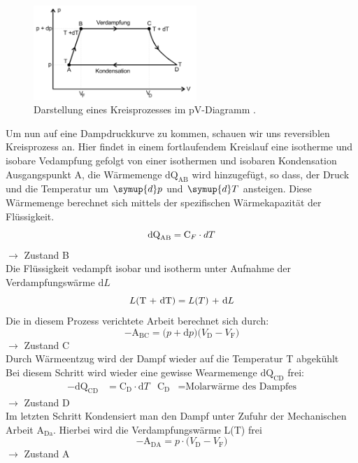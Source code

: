 \begin{figure}[H]
    \centering
    \includegraphics[width=0.55\textwidth]{images/Kreislauf.PNG}
    \caption{Darstellung eines Kreisprozesses im pV-Diagramm \protect \cite{V203}.}
    \label{img:Kreislauf}
\end{figure}
Um nun auf eine Dampdruckkurve zu kommen, schauen wir uns reversiblen Kreisprozess an. Hier findet in einem fortlaufendem 
Kreislauf eine isotherme und isobare Vedampfung gefolgt von einer isothermen und isobaren Kondensation
Ausgangspunkt A, die Wärmemenge $\text{dQ}_\text{AB} $ wird hinzugefügt, so dass, der Druck und die Temperatur um $\symup{d}p$ und $\symup{d}T$ ansteigen.
Diese Wärmemenge berechnet sich mittels der spezifischen Wärmekapazität der Flüssigkeit.
\begin{equation}
    \text{dQ}_\text{AB}= \text{C}_F \cdot dT \nonumber\\
\end{equation}
$\rightarrow$ Zustand B\\
Die Flüssigkeit vedampft isobar und isotherm unter Aufnahme der Verdampfungswärme d$L$\\
\begin{equation}
L\text{(T + dT)} = L\text{(}T\text{) + d}L\nonumber\\
\end{equation}
Die in diesem Prozess verichtete Arbeit berechnet sich durch:\\
\begin{equation}
   - \text{A}_\text{BC} = \text{(}p + \text{d}p\text{)(}V_\text{D} - V_\text{F}\text{)} \nonumber
\end{equation}
$\rightarrow$ Zustand C\\
Durch Wärmeentzug wird der Dampf wieder auf die Temperatur T abgekühlt \\
Bei diesem Schritt wird wieder eine gewisse Wearmemenge $\text{dQ}_\text{CD}$ frei:
\begin{align}
 -\text{dQ}_\text{CD} &=\text{C}_\text{D}\cdot \text{d}T & \text{C}_\text{D}&=\text{Molarwärme des Dampfes}  \nonumber 
\end{align}
$\rightarrow$ Zustand D\\
Im letzten Schritt Kondensiert man den Dampf unter Zufuhr der Mechanischen Arbeit $\text{A}_\text{Da}$.
Hierbei wird die Verdampfungswärme L(T) frei\\ 
\begin{equation}
    -\text{A}_\text{DA}= p\cdot\text{(}V_\text{D} - V_\text{F}\text{)}  \nonumber
\end{equation}
$\rightarrow$ Zustand A\\

